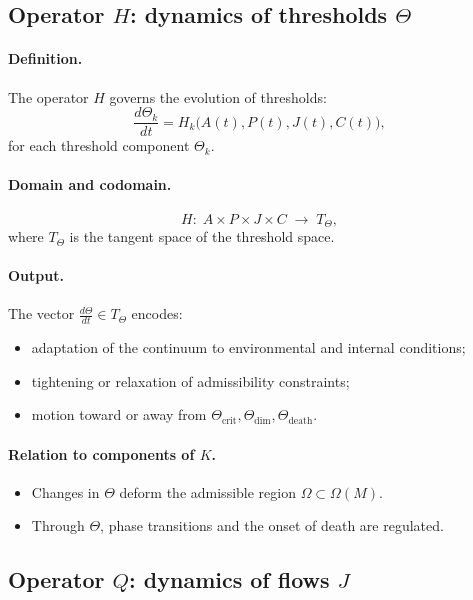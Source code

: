 \subsection{Operator \texorpdfstring{\(H\)}{H}: dynamics of thresholds \texorpdfstring{\(\Theta\)}{\Theta}}

\paragraph{Definition.}
The operator \(H\) governs the evolution of thresholds:
\[
  \frac{d\Theta_k}{dt} = H_k\bigl(A(t),P(t),J(t),C(t)\bigr),
\]
for each threshold component \(\Theta_k\).

\paragraph{Domain and codomain.}
\[
  H:\; A\times P\times J\times C \;\longrightarrow\; T_\Theta,
\]
where \(T_\Theta\) is the tangent space of the threshold space.

\paragraph{Output.}
The vector \(\frac{d\Theta}{dt}\in T_\Theta\) encodes:
\begin{itemize}
  \item adaptation of the continuum to environmental and internal conditions;
  \item tightening or relaxation of admissibility constraints;
  \item motion toward or away from \(\Theta_{\mathrm{crit}}, \Theta_{\mathrm{dim}}, \Theta_{\mathrm{death}}\).
\end{itemize}

\paragraph{Relation to components of \texorpdfstring{\(K\)}{K}.}
\begin{itemize}
  \item Changes in \(\Theta\) deform the admissible region \(\Omega\subset\Omega(M)\).
  \item Through \(\Theta\), phase transitions and the onset of death are regulated.
\end{itemize}

\subsection{Operator \texorpdfstring{\(Q\)}{Q}: dynamics of flows \texorpdfstring{\(J\)}{J}}

